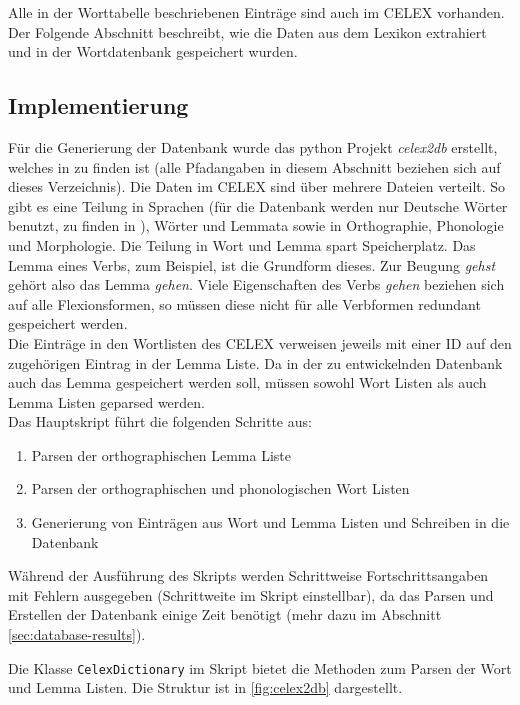 Alle in der Worttabelle beschriebenen Einträge sind auch im CELEX vorhanden. Der Folgende Abschnitt beschreibt, wie die Daten aus dem Lexikon extrahiert und in der Wortdatenbank gespeichert wurden.

\subsection{Implementierung}

Für die Generierung der Datenbank wurde das python Projekt \textit{celex2db} erstellt, welches in  zu finden ist (alle Pfadangaben in diesem Abschnitt beziehen sich auf dieses Verzeichnis). Die Daten im CELEX  sind über mehrere Dateien verteilt. So gibt es eine Teilung in Sprachen (für die Datenbank werden nur Deutsche Wörter benutzt, zu finden in ), Wörter und Lemmata sowie in Orthographie, Phonologie und Morphologie. Die Teilung in Wort und Lemma spart Speicherplatz. Das Lemma eines Verbs, zum Beispiel, ist die Grundform dieses. Zur Beugung \textit{gehst} gehört also das Lemma \textit{gehen}. Viele Eigenschaften des Verbs \textit{gehen} beziehen sich auf alle Flexionsformen, so müssen diese nicht für alle Verbformen redundant gespeichert werden.\\
Die Einträge in den Wortlisten des CELEX verweisen jeweils mit einer ID auf den zugehörigen Eintrag in der Lemma Liste. Da in der zu entwickelnden Datenbank auch das Lemma gespeichert werden soll, müssen sowohl Wort Listen als auch Lemma Listen geparsed werden.\\

Das Hauptskript  führt die folgenden Schritte aus:
\begin{enumerate}
	\item Parsen der orthographischen Lemma Liste
	\item Parsen der orthographischen und phonologischen Wort Listen
	\item Generierung von Einträgen aus Wort und Lemma Listen und Schreiben in die Datenbank
\end{enumerate}
Während der Ausführung des Skripts werden Schrittweise Fortschrittsangaben mit Fehlern ausgegeben (Schrittweite im Skript einstellbar), da das Parsen und Erstellen der Datenbank einige Zeit benötigt (mehr dazu im Abschnitt \ref{sec:database-results}).

Die Klasse \texttt{CelexDictionary} im Skript  bietet die Methoden zum Parsen der Wort und Lemma Listen. Die Struktur ist in \ref{fig:celex2db} dargestellt.\\

